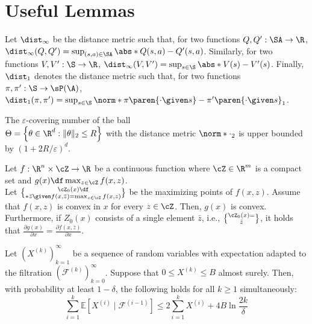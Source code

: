 \section{Useful Lemmas}\label{appendix:useful-lemma}

\begin{definition}
Let $\dist_{\infty}$ be the distance metric such that, for two functions $Q, Q': \SA \to \R$, $\dist_\infty(Q, Q') = \sup_{(s, a) \in \SA} \abs*{Q(s, a) - Q'(s, a)}$. 
Similarly, for two functions $V, V': \S \to \R$, $\dist_\infty(V, V') = \sup_{s \in \S} \abs*{V(s) - V'(s)}$. 
Finally, $\dist_1$ denotes the distance metric such that, for two functions $\pi, \pi': \S \to \sP(\A)$, $\dist_1(\pi, \pi') = \sup_{s \in \S} \norm*{\pi\paren{\cdot \given s} - \pi'\paren{\cdot \given s}}_1$. 
\end{definition}

\begin{lemma}\label{lemma:ball-covering-bound}
The $\varepsilon$-covering number of the ball \\    
$\Theta=\left\{\theta \in \R^d:\|\theta\|_2 \leq R \right\}$ with the distance metric $\norm*{\cdot}_2$ is upper bounded by $(1+2 R / \varepsilon)^d$.
\end{lemma}


\begin{lemma}\label{lemma:danskin's theorem}
    Let $f: \R^n \times \cZ \to \R$ be a continuous function where $\cZ \in \R^m$ is a compact set and $g(x) \df \max_{z\in \cZ} f(x, z)$.\\
    Let $\cZ_0(x) \df \brace*{\bar{z} \given f(x, \bar{z})=\max_{z\in \cZ}f(x, z)}$ be the maximizing points of $f(x, z)$.
    Assume that $f(x, z)$ is convex in $x$ for every $z\in \cZ$. 
    Then, $g(x)$ is convex.
    Furthermore, if $Z_0(x)$ consists of a single element $\bar{z}$, i.e., $\cZ_0(x)=\brace{\bar{z}}$, it holds that
    $\frac{\partial g(x)}{\partial x}=\frac{\partial f(x, \bar{z})}{\partial x}$.
\end{lemma}

\begin{lemma}\label{lemma:exp-to-concrete}
Let $\left(X^{(k)}\right)_{k=1}^{\infty}$ be a sequence of random variables with expectation adapted to the filtration $\left(\mathcal{F}^{(k)}\right)_{k=0}^{\infty}$. 
Suppose that $0 \leq X^{(k)} \leq B$ almost surely. 
Then, with probability at least $1-\delta$, the following holds for all $k \geq 1$ simultaneously:    
$$
\sum_{i=1}^k \mathbb{E}\left[X^{(i)} \mid \mathcal{F}^{(i-1)}\right] \leq 2 \sum_{i=1}^k X^{(i)}+4 B \ln \frac{2 k}{\delta}
$$
\end{lemma}

